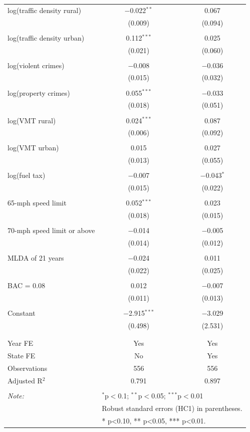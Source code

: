 \begin{table}[!htbp]
\begin{tabular}{@{\extracolsep{5pt}}lcc}
 log(traffic density rural) & $-$0.022$^{**}$ & 0.067 \\ 
  & (0.009) & (0.094) \\ 
  & & \\ 
 log(traffic density urban) & 0.112$^{***}$ & 0.025 \\ 
  & (0.021) & (0.060) \\ 
  & & \\ 
 log(violent crimes) & $-$0.008 & $-$0.036 \\ 
  & (0.015) & (0.032) \\ 
  & & \\ 
 log(property crimes) & 0.055$^{***}$ & $-$0.033 \\ 
  & (0.018) & (0.051) \\ 
  & & \\ 
 log(VMT rural) & 0.024$^{***}$ & 0.087 \\ 
  & (0.006) & (0.092) \\ 
  & & \\ 
 log(VMT urban) & 0.015 & 0.027 \\ 
  & (0.013) & (0.055) \\ 
  & & \\ 
 log(fuel tax) & $-$0.007 & $-$0.043$^{*}$ \\ 
  & (0.015) & (0.022) \\ 
  & & \\ 
 65-mph speed limit & 0.052$^{***}$ & 0.023 \\ 
  & (0.018) & (0.015) \\ 
  & & \\ 
 70-mph speed limit or above & $-$0.014 & $-$0.005 \\ 
  & (0.014) & (0.012) \\ 
  & & \\ 
 MLDA of 21 years & $-$0.024 & 0.011 \\ 
  & (0.022) & (0.025) \\ 
  & & \\ 
 BAC = 0.08 & 0.012 & $-$0.007 \\ 
  & (0.011) & (0.013) \\ 
  & & \\ 
 Constant & $-$2.915$^{***}$ & $-$3.029 \\ 
  & (0.498) & (2.531) \\ 
  & & \\ 
\hline \\[-1.8ex] 
Year FE & Yes & Yes \\ 
State FE & No & Yes \\ 
Observations & 556 & 556 \\ 
Adjusted R$^{2}$ & 0.791 & 0.897 \\ 
\hline 
\hline \\[-1.8ex] 
\textit{Note:}  & \multicolumn{2}{l}{$^{*}$p$<$0.1; $^{**}$p$<$0.05; $^{***}$p$<$0.01} \\ 
 & \multicolumn{2}{l}{Robust standard errors (HC1) in parentheses.} \\ 
 & \multicolumn{2}{l}{* p<0.10, ** p<0.05, *** p<0.01.} \\ 
\end{tabular} 
\end{table} 
